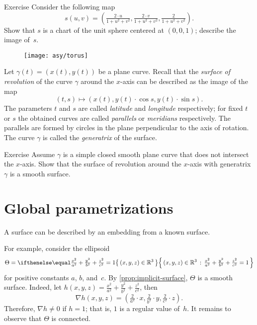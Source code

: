 \begin{thm}{Exercise}\label{ex:inversion-chart}
Consider the following map 
\[s(u,v)=(\tfrac{2\cdot u}{1+u^2+v^2},\tfrac{2\cdot v}{1+u^2+v^2},\tfrac{2}{1+u^2+v^2}).\]
Show that $s$ is a chart of the unit sphere centered at $(0,0,1)$; describe the image of~$s$.
\end{thm}

\begin{wrapfigure}{o}{31 mm}
\vskip-3mm
\centering
\texttt{[image: asy/torus]}
\vskip0mm
\end{wrapfigure}

Let $\gamma(t)=(x(t),y(t))$ be a plane curve.
Recall that the \emph{surface of revolution} of the curve $\gamma$ around the $x$-axis can be described as the 
image of the map 
\[(t, s)\mapsto (x(t), y(t)\cdot\cos s,y(t)\cdot\sin s).\]
The parameters $t$ and $s$ are called \emph{latitude} and \emph{longitude} respectively;
for fixed $t$ or $s$ the obtained curves are called \emph{parallels} or
\emph{meridians} respectively. 
The parallels are formed by circles in the plane perpendicular to the axis of rotation.
The curve $\gamma$ is called the \emph{generatrix} of the surface.

\begin{thm}{Exercise}\label{ex:revolution}
Assume $\gamma$ is a simple closed smooth plane curve that does not intersect the $x$-axis.
Show that the surface of revolution around the $x$-axis with generatrix $\gamma$ is a smooth surface.
\end{thm}


\section{Global parametrizations}\label{sec:global-parametrizations}

A surface can be described by an embedding from a known surface.

For example, consider the ellipsoid
\[\Theta=\set{(x,y,z)\in\mathbb{R}^3}{\tfrac{x^2}{a^2}+\tfrac{y^2}{b^2}+\tfrac{z^2}{c^2}=1}\]
for positive constants $a$, $b$, and~$c$.
By \ref{prop:implicit-surface}, $\Theta$ is a smooth surface.
Indeed, let $h(x,y,z)=\tfrac{x^2}{a^2}+\tfrac{y^2}{b^2}+\tfrac{z^2}{c^2}$,
then
\[\nabla h(x,y,z)=(\tfrac{2}{a^2}\cdot x,\tfrac{2}{b^2}\cdot y,\tfrac{2}{c^2}\cdot z).\]
Therefore, $\nabla h\ne0$ if $h=1$; that is, $1$ is a regular value of~$h$.
It remains to observe that $\Theta$ is connected.

